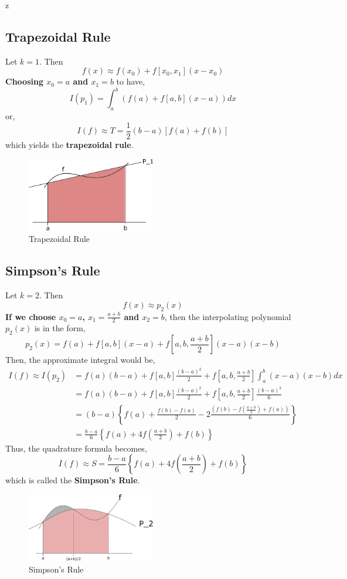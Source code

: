 z\documentclass[a4paper,12pt,twoside]{book}
\begin{document}
\subsection{Trapezoidal Rule}
Let $k=1$. Then
\[f(x) \approx f(x_0) + f[x_0,x_1](x-x_0)\]
\textbf{Choosing $x_0 = a$ and $x_1 = b$} to have,
\[ I(p_1) = \int_a^b \left( f(a) + f[a,b](x-a) \right) dx\]
or,
\begin{equation}
    I(f)\approx T = \frac{1}{2}(b-a)[f(a)+f(b)]
\end{equation}
which yields the \textbf{trapezoidal rule}.
\begin{figure}
    \centering
    \includegraphics[width=0.5\textwidth]{TrapezoidalRule.pdf}
    \caption{Trapezoidal Rule}
    \label{fig:3}
\end{figure}
\subsection{Simpson's Rule}
Let $k=2$. Then
\[f(x) \approx p_2(x)\]
\textbf{If we choose $x_0 = a$, $x_1 = \frac{a+b}{2}$ and $x_2 = b$}, then the interpolating polynomial $p_2(x)$ is in the form,
\[p_2(x) = f(a) + f[a,b](x-a) + f\left[a,b,\frac{a+b}{2}\right](x-a)(x-b)\]
Then, the approximate integral would be,
\begin{equation}
    \begin{split}
        I(f) \approx I(p_2) &= f(a)(b-a) + f[a,b]\frac{(b-a)^2}{2} + f\left[ a,b,\frac{a+b}{2} \right]\int_a^b(x-a)(x-b)dx\\
        &=f(a)(b-a) + f[a,b]\frac{(b-a)^2}{2} + f\left[ a,b,\frac{a+b}{2} \right]\frac{(b-a)^3}{6}\\
        &= (b-a)\left\{ f(a) + \frac{f(b) -f(a)}{2} -2 \frac{\left( f(b) - f\left( \frac{a+b}{2} \right) + f(a)\right)}{6}\right\}\\
        &= \frac{b-a}{6} \left\{ f(a) + 4f\left(\frac{a+b}{2} \right) + f(b) \right\}
    \end{split}
\end{equation}
Thus, the quadrature formula becomes,
\begin{equation}
    I(f) \approx S = \frac{b-a}{6} \left\{ f(a) + 4f\left( \frac{a+b}{2}\right) + f(b) \right\}
\end{equation}
which is called the \textbf{Simpson's Rule}.
\begin{figure}
    \centering
    \includegraphics[width = 0.5\textwidth]{SimpsonRule.pdf}
    \caption{Simpson's Rule}
    \label{fig:4}
\end{figure}
\end{document}
